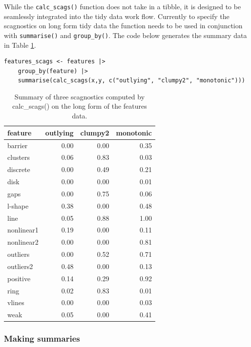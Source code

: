 While the \texttt{calc\_scags()} function does not take in a tibble, it is designed to be seamlessly integrated into the tidy data work flow. Currently to specify the scagnostics on long form tidy data the function needs to be used in conjunction with \texttt{summarise()} and \texttt{group\_by()}. The code below generates the summary data in Table \ref{tab:featuresscags-pdf}.

\begin{verbatim}
features_scags <- features |>
    group_by(feature) |>
    summarise(calc_scags(x,y, c("outlying", "clumpy2", "monotonic")))
\end{verbatim}

\begin{table}

\caption{\label{tab:featuresscags-pdf}Summary of three scagnostics computed by calc\_scags() on the long form of the features data.}
\centering
\begin{tabular}[t]{>{\raggedright\arraybackslash}p{3cm}rrr}
\toprule
feature & outlying & clumpy2 & monotonic\\
\midrule
barrier & 0.00 & 0.00 & 0.35\\
clusters & 0.06 & 0.83 & 0.03\\
discrete & 0.00 & 0.49 & 0.21\\
disk & 0.00 & 0.00 & 0.01\\
gaps & 0.00 & 0.75 & 0.06\\
\addlinespace
l-shape & 0.38 & 0.00 & 0.48\\
line & 0.05 & 0.88 & 1.00\\
nonlinear1 & 0.19 & 0.00 & 0.11\\
nonlinear2 & 0.00 & 0.00 & 0.81\\
outliers & 0.00 & 0.52 & 0.71\\
\addlinespace
outliers2 & 0.48 & 0.00 & 0.13\\
positive & 0.14 & 0.29 & 0.92\\
ring & 0.02 & 0.83 & 0.01\\
vlines & 0.00 & 0.00 & 0.03\\
weak & 0.05 & 0.00 & 0.41\\
\bottomrule
\end{tabular}
\end{table}

\hypertarget{making-summaries}{%
\subsubsection{Making summaries}\label{making-summaries}}

